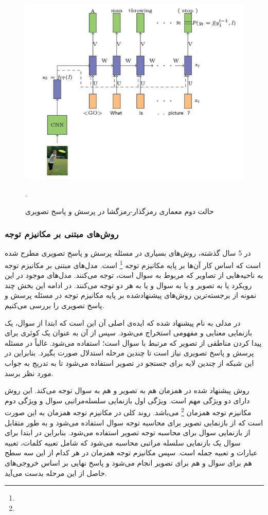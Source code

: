 \begin{figure}
	\centerline{\includegraphics[scale=0.4]{images/encoder-decoder2.JPG}}
	\caption{حالت دوم معماری رمزگذار-رمزگشا در پرسش و پاسخ تصویری}.
	\label{fig:encoderdecoder2}
\end{figure}

\subsubsection{ روش‌های مبتنی بر مکانیزم توجه}
در 5 سال گذشته، روش‌های بسیاری در مسئله پرسش و پاسخ تصویری مطرح شده است که اساس کار آن‌ها بر پایه مکانیزم توجه
\footnote{}
 است. مدل‌های مبتنی بر مکانیزم توجه به ناحیه‌هایی از تصاویر که مربوط به سوال است، توجه می‌کنند. مدل‌های موجود در این رویکرد یا به تصویر و یا به سوال و یا به هر دو توجه می‌کنند. در ادامه این بخش چند نمونه از برجسته‌ترین روش‌های پیشنهادشده بر پایه مکانیزم توجه در مسئله پرسش و پاسخ تصویری را بررسی می‌کنیم.

در 
\cite{yang2016stacked}
مدلی به نام 
پیشنهاد شده که ایده‌ی اصلی آن این است که ابتدا از سوال، یک  بازنمایی معنایی و مفهومی استخراج می‌شود. سپس از آن به عنوان یک کوئری برای پیدا کردن مناطقی از تصویر که مرتبط با سوال است؛ استفاده می‌شود. غالباً در مسئله پرسش و پاسخ تصویری نیاز است تا چندین مرحله استدلال صورت بگیرد. بنابراین در این شبکه از چندین لایه برای جستجو در تصویر استفاده می‌شود تا به تدریج به جواب مورد نظر برسد.

روش پیشنهاد شده در 
\cite{lu2016hierarchical}
همزمان هم به تصویر و هم به سوال توجه می‌کند. این روش دارای دو ویژگی مهم است. ویژگی اول بازنمایی سلسله‌مراتبی سوال و ویژگی دوم مکانیزم توجه همزمان
\footnote{}
 می‌باشد. روند کلی در مکانیزم توجه همزمان به این صورت است که از بازنمایی تصویر برای محاسبه توجه سوال استفاده می‌شود و به طور متقابل از بازنمایی سوال برای محاسبه توجه تصویر استفاده می‌شود. بنابراین در
\cite{lu2016hierarchical}
 ابتدا برای سوال یک بازنمایی سلسله مراتبی محاسبه می‌شود که شامل تعبیه کلمات، تعبیه عبارات و تعبیه جمله است. سپس مکانیزم توجه همزمان در هر کدام از این سه سطح هم برای سوال و هم برای تصویر انجام می‌شود و پاسخ نهایی بر اساس خروجی‌های حاصل از این مرحله بدست می‌آید.
 
